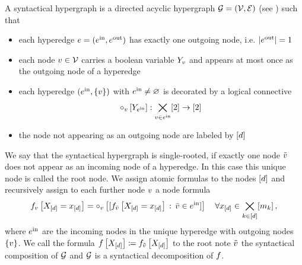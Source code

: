 \begin{definition}
    \label{def:formulaDecomposition}
    A syntactical hypergraph is a directed acyclic hypergraph $\mathcal{G}=(\mathcal{V},\mathcal{E})$ (see ) such that
    \begin{itemize}
        \item each hyperedge $e=(e^{\mathrm{in}},e^{\mathrm{out}})$ has exactly one outgoing node, i.e. $\left|e^{\mathrm{out}}\right|=1$
        \item each node $v\in\mathcal{V}$ carries a boolean variable $Y_{v}$ and appears at most once as the outgoing node of a hyperedge %
        \item each hyperedge $(e^{\mathrm{in}},\{v\})$ with $e^{\mathrm{in}}\neq\varnothing$ is decorated by a logical connective
        \begin{align*}
            \circ_{v}\left[Y_{e^{\mathrm{in}}}\right] : \bigtimes_{v\in e^{\mathrm{in}}} [2] \rightarrow [2]
        \end{align*}
        \item the node not appearing as an outgoing node are labeled by $[d]$
    \end{itemize}
    We say that the syntactical hypergraph is single-rooted, if exactly one node $\tilde{v}$ does not appear as an incoming node of a hyperedge.
    In this case this unique node is called the root node. %
    We assign atomic formulas to the nodes $[d]$ and recursively assign to each further node $v$ a node formula %
    \begin{align*}
        f_{v}\left[X_{[d]}=x_{[d]}\right]
        = \circ_{v}\left[[f_{\bar{v}}\left[X_{[d]}=x_{[d]}\right]\,:\,\bar{v}\in e^{\mathrm{in}}]\right] \quad \forall x_{[d]}\in\bigtimes_{k\in[d]}[m_{k}]\, ,
    \end{align*}
    where $e^{\mathrm{in}}$ are the incoming nodes in the unique hyperedge with outgoing nodes $\{v\}$.
    We call the formula $f\left[X_{[d]}\right]\coloneqq f_{\tilde{v}}\left[X_{[d]}\right]$ to the root note $\tilde{v}$ the syntactical composition of $\mathcal{G}$ and $\mathcal{G}$ is a syntactical decomposition of $f$.
\end{definition}


